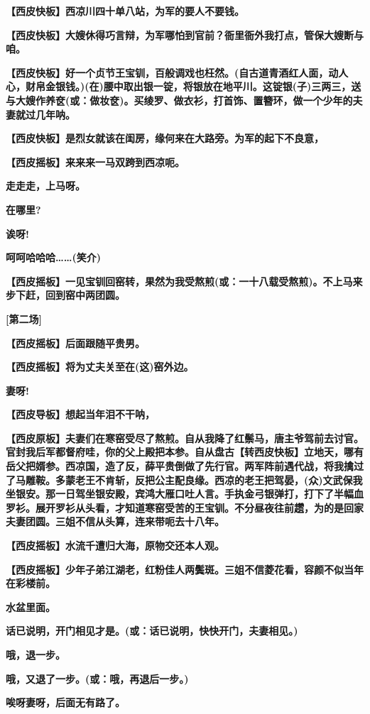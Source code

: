\textbf{【西皮快板】西凉川四十单八站，为军的要人不要钱。}

\textbf{【西皮快板】大嫂休得巧言辩，为军哪怕到官前？衙里衙外我打点，管保大嫂断与咱。}

\textbf{【西皮快板】好一个贞节王宝钏，百般调戏也枉然。(自古道青酒红人面，动人心，财帛金银钱。)(在)腰中取出银一锭，将银放在地平川。这锭银(子)三两三，送与大嫂作养奁(或：做妆奁)。买绫罗、做衣衫，打首饰、置簪环，做一个少年的夫妻就过几年呐。}

\textbf{【西皮快板】是烈女就该在闺房，缘何来在大路旁。为军的起下不良意，}

\textbf{【西皮摇板】来来来一马双跨到西凉呃。}

\textbf{走走走，上马呀。}

\textbf{在哪里?}

\textbf{诶呀!}

\textbf{呵呵哈哈哈\ldots{}\ldots{}(笑介)}

\textbf{【西皮摇板】一见宝钏回窑转，果然为我受熬煎(或：一十八载受熬煎)。不上马来步下赶，回到窑中两团圆。}

\textbf{{[}第二场{]}}

\textbf{【西皮摇板】后面跟随平贵男。}

\textbf{【西皮摇板】将为丈夫关至在(这)窑外边。}

\textbf{妻呀!}

\textbf{【西皮导板】想起当年泪不干呐，}

\textbf{【西皮原板】夫妻们在寒窑受尽了熬煎。自从我降了红鬃马，唐主爷驾前去讨官。官封我后军都督府哇，你的父上殿把本参。自从盘古【转西皮快板】立地天，哪有岳父把婿参。西凉国，造了反，薛平贵倒做了先行官。两军阵前遇代战，将我擒过了马雕鞍。多蒙老王不肯斩，反把公主配良缘。西凉的老王把驾晏，(众)文武保我坐银安。那一日驾坐银安殿，宾鸿大雁口吐人言。手执金弓银弹打，打下了半幅血罗衫。展开罗衫从头看，才知道寒窑受苦的王宝钏。不分昼夜往前趱，为的是回家夫妻团圆。三姐不信从头算，连来带呃去十八年。}

\textbf{【西皮摇板】水流千遭归大海，原物交还本人观。}

\textbf{【西皮摇板】少年子弟江湖老，红粉佳人两鬓斑。三姐不信菱花看，容颜不似当年在彩楼前。}

\textbf{水盆里面。}

\textbf{话已说明，开门相见才是。(或：话已说明，快快开门，夫妻相见。)}

\textbf{哦，退一步。}

\textbf{哦，又退了一步。(或：哦，再退后一步。)}

\textbf{唉呀妻呀，后面无有路了。}

